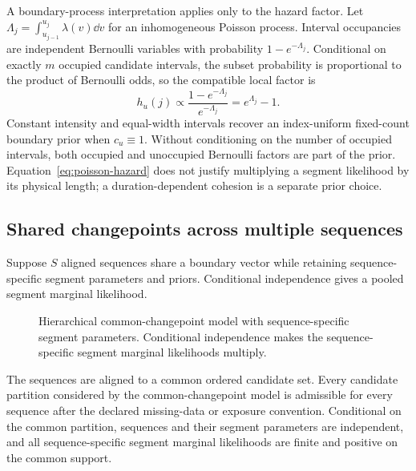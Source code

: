 A boundary-process interpretation applies only to the hazard factor. Let
$\Lambda_j=\int_{u_{j-1}}^{u_j}\lambda(v)\dd v$ for an inhomogeneous Poisson process. Interval
occupancies are independent Bernoulli variables with probability $1-e^{-\Lambda_j}$. Conditional
on exactly $m$ occupied candidate intervals, the subset probability is proportional to the product
of Bernoulli odds, so the compatible local factor is
\begin{equation}
 h_u(j)\propto \frac{1-e^{-\Lambda_j}}{e^{-\Lambda_j}}=e^{\Lambda_j}-1.
\label{eq:poisson-hazard}
\end{equation}
Constant intensity and equal-width intervals recover an index-uniform fixed-count boundary prior when $c_u\equiv1$. Without conditioning on the number of occupied intervals, both occupied and unoccupied Bernoulli factors are part of the prior. Equation~\eqref{eq:poisson-hazard} does not justify multiplying a segment likelihood by its physical length; a duration-dependent cohesion is a separate prior choice.

\subsection{Shared changepoints across multiple sequences}
Suppose $S$ aligned sequences share a boundary vector while retaining sequence-specific segment parameters and priors. Conditional independence gives a pooled segment marginal likelihood.

\begin{figure}[t]
  \centering
  \resizebox{0.96\columnwidth}{!}{}
  \caption{Hierarchical common-changepoint model with sequence-specific segment parameters. Conditional independence makes the sequence-specific segment marginal likelihoods multiply.}
  \label{fig:shared-boundary-paper}
\end{figure}

\begin{assumption}
\label{ass:shared-support}
The sequences are aligned to a common ordered candidate set. Every candidate partition considered by the common-changepoint model is admissible for every sequence after the declared missing-data or exposure convention. Conditional on the common partition, sequences and their segment parameters are independent, and all sequence-specific segment marginal likelihoods are finite and positive on the common support.
\end{assumption}

